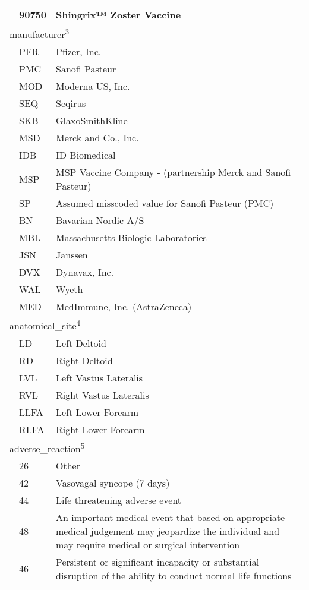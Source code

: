 \documentclass[
  letterpaper,
  DIV=11,
  numbers=noendperiod]{scrreprt}
\begin{document}
\begin{longtable}{l|ll}
  & 90750 & Shingrix™ Zoster Vaccine \\ 
\midrule
\multicolumn{3}{l}{manufacturer\textsuperscript{3}} \\ 
\midrule
  & PFR & Pfizer, Inc. \\ 
  & PMC & Sanofi Pasteur \\ 
  & MOD & Moderna US, Inc. \\ 
  & SEQ & Seqirus \\ 
  & SKB & GlaxoSmithKline \\ 
  & MSD & Merck and Co., Inc. \\ 
  & IDB & ID Biomedical \\ 
  & MSP & MSP Vaccine Company - (partnership Merck and Sanofi Pasteur) \\ 
  & SP & Assumed misscoded value for Sanofi Pasteur (PMC) \\ 
  & BN & Bavarian Nordic A/S \\ 
  & MBL & Massachusetts Biologic Laboratories \\ 
  & JSN & Janssen \\ 
  & DVX & Dynavax, Inc. \\ 
  & WAL & Wyeth \\ 
  & MED & MedImmune, Inc. (AstraZeneca) \\ 
\midrule
\multicolumn{3}{l}{anatomical\_site\textsuperscript{4}} \\ 
\midrule
  & LD & Left Deltoid \\ 
  & RD & Right Deltoid \\ 
  & LVL & Left Vastus Lateralis \\ 
  & RVL & Right Vastus Lateralis \\ 
  & LLFA & Left Lower Forearm \\ 
  & RLFA & Right Lower Forearm \\ 
\midrule
\multicolumn{3}{l}{adverse\_reaction\textsuperscript{5}} \\ 
\midrule
  & 26 & Other \\ 
  & 42 & Vasovagal syncope (7 days) \\ 
  & 44 & Life threatening adverse event \\ 
  & 48 & An important medical event that based on appropriate medical judgement may jeopardize the
                         individual and may require medical or surgical intervention \\ 
  & 46 & Persistent or significant incapacity or substantial disruption of the ability to 
                         conduct normal life functions \\ 

\end{longtable}
\end{document}
